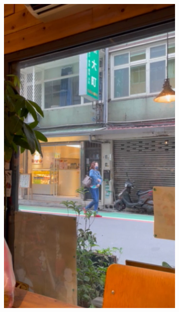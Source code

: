 \documentclass[12pt]{article}
\theoremstyle{definition}
\begin{document}
\begin{figure}[ht]
\begin{subfigure}[b]{0.3\textwidth}
         \includegraphics[width=\textwidth]{ch3_figures/video_2.png}
         \label{fig:video_2}
     \end{subfigure}
     \hfill
     \begin{subfigure}[b]{0.3\textwidth}
         \centering

\end{subfigure}
\end{figure}
\end{document}
